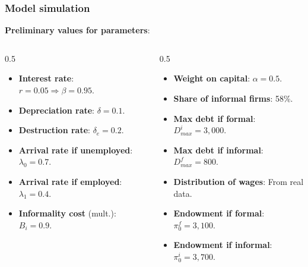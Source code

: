 \documentclass[aspectratio=169]{beamer} %
\begin{document}
\begin{frame}
\frametitle{Model simulation}

\textbf{Preliminary values for parameters}:

\begin{columns}[T] 
    \begin{column}{0.5\textwidth} 
        \begin{itemize}
            \item \textbf{Interest rate}: $r = 0.05 \Rightarrow \beta = 0.95$.
            \item \textbf{Depreciation rate}: $\delta = 0.1 $.
            \item \textbf{Destruction rate}: $\delta_e = 0.2 $.
            \item \textbf{Arrival rate if unemployed}: $\lambda_0 = 0.7 $.
            \item \textbf{Arrival rate if employed}: $\lambda_1 = 0.4 $.
            \item \textbf{Informality cost} (mult.): $B_i = 0.9 $.
        \end{itemize}
    \end{column}

    \begin{column}{0.5\textwidth} 
        \begin{itemize}
            \item \textbf{Weight on capital}: $\alpha = 0.5$.            
            \item \textbf{Share  of informal firms}: 58\%.
            \item \textbf{Max debt if formal}: $D^i_{max} = 3,000$.
            \item \textbf{Max debt if informal}: $D^f_{max} = 800$.
            \item \textbf{Distribution of wages}: From real data.
            \item \textbf{Endowment if formal}: $\pi^f_0 = 3,100$.
            \item \textbf{Endowment if informal}: $\pi^i_0 = 3,700$.
        \end{itemize}
    \end{column}
\end{columns}

\end{frame}

\end{document}
